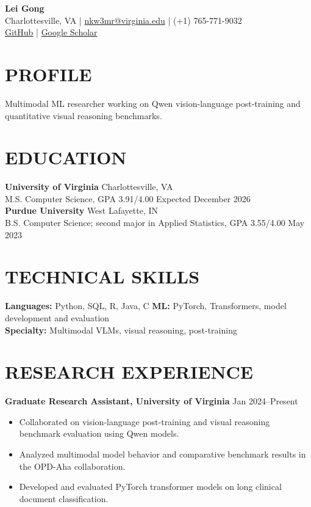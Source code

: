 \documentclass[10pt, letterpaper]{article}
\begin{document}
\setlength{\parindent}{0pt}
\begin{center}
{\fontsize{23}{25}\selectfont\textbf{Lei Gong}}\\[3pt]
Charlottesville, VA \quad | \quad \href{mailto:nkw3mr@virginia.edu}{nkw3mr@virginia.edu} \quad | \quad (+1) 765-771-9032\\[2pt]
\href{https://github.com/LeiGong0125Carrot}{GitHub} \quad | \quad \href{https://scholar.google.com/citations?user=8QLAkKMAAAAJ}{Google Scholar}
\end{center}
\vspace{-3mm}
\section{PROFILE}
Multimodal ML researcher working on Qwen vision-language post-training and quantitative visual reasoning benchmarks.
\section{EDUCATION}
\textbf{University of Virginia} \hfill Charlottesville, VA \\
M.S. Computer Science, GPA 3.91/4.00 \hfill Expected December 2026\\[1pt]
\textbf{Purdue University} \hfill West Lafayette, IN \\
B.S. Computer Science; second major in Applied Statistics, GPA 3.55/4.00 \hfill May 2023
\section{TECHNICAL SKILLS}
\textbf{Languages:} Python, SQL, R, Java, C \quad \textbf{ML:} PyTorch, Transformers, model development and evaluation\\
\textbf{Specialty:} Multimodal VLMs, visual reasoning, post-training
\section{RESEARCH EXPERIENCE}
\textbf{Graduate Research Assistant, University of Virginia} \hfill Jan 2024--Present
\begin{itemize}
\item Collaborated on vision-language post-training and visual reasoning benchmark evaluation using Qwen models.
\item Analyzed multimodal model behavior and comparative benchmark results in the OPD-Aha collaboration.
\item Developed and evaluated PyTorch transformer models on long clinical document classification.
\end{itemize}
\end{document}
